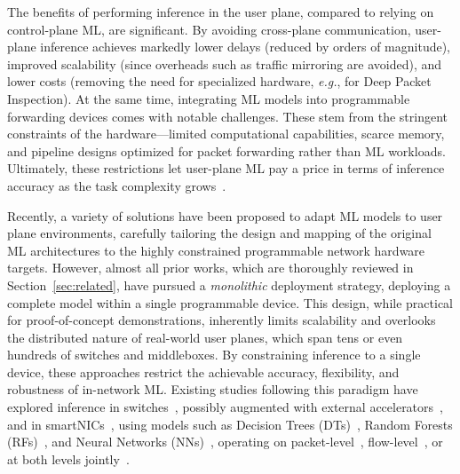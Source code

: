 \documentclass[journal]{IEEEtran}
\theoremstyle{plain} %
\newcommand{\eg}{\textit{e.g.},\xspace}
\begin{document}
%

The benefits of performing inference in the user plane, compared to relying on control-plane ML, are significant. By avoiding cross-plane communication, user-plane inference achieves markedly lower delays (reduced by orders of magnitude), improved scalability (since overheads such as traffic mirroring are avoided), and lower costs (removing the need for specialized hardware, \eg for Deep Packet Inspection). 
At the same time, integrating ML models into programmable forwarding devices comes with notable challenges. These stem from the stringent constraints of the hardware---limited computational capabilities, scarce memory, and pipeline designs optimized for packet forwarding rather than ML workloads. Ultimately, these restrictions let user-plane ML pay a price in terms of inference accuracy as the task complexity grows~\cite{jewel-infocom24}.

Recently, a variety of solutions have been proposed to adapt ML models to user plane environments, carefully tailoring the design and mapping of the original ML architectures to the highly constrained programmable network hardware targets. However, almost all prior works, which are thoroughly reviewed in Section~\ref{sec:related}, have pursued a \textit{monolithic} deployment strategy, deploying a complete model within a single programmable device. This design, while practical for proof-of-concept demonstrations, inherently limits scalability and overlooks the distributed nature of real-world user planes, which span tens or even hundreds of switches and middleboxes. By constraining inference to a single device, these approaches restrict the achievable accuracy, flexibility, and robustness of in-network ML. Existing studies following this paradigm have explored inference in switches~\cite{pForest.2019}, possibly augmented with external accelerators~\cite{Taurus.2022}, and in smartNICs~\cite{N3IC.2022}, using models such as Decision Trees (DTs)~\cite{mousika-journal-ton23}, Random Forests (RFs)~\cite{planter-journal-ccr24}, and Neural Networks (NNs)~\cite{brain-on-switch-nsdi24}, operating on packet-level~\cite{ilsy-hotnets19}, flow-level~\cite{flowrest}, or at both levels jointly~\cite{jewel-infocom24}.
\end{document}

